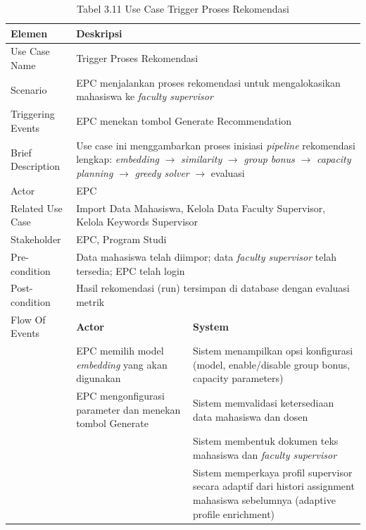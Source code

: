 \begin{longtable}{|p{3.5cm}|p{4.5cm}|p{5cm}|}
\caption{Tabel 3.11 Use Case Trigger Proses Rekomendasi} \label{table:tab3.11} \\
\hline
\textbf{Elemen} & \multicolumn{2}{p{\ucdeskcol}|}{\textbf{Deskripsi}} \\
\hline
\endfirsthead
\endhead
\hline
\endfoot
Use Case Name & \multicolumn{2}{p{\ucdeskcol}|}{Trigger Proses Rekomendasi} \\
\hline
Scenario & \multicolumn{2}{p{\ucdeskcol}|}{EPC menjalankan proses rekomendasi untuk mengalokasikan mahasiswa ke \textit{faculty supervisor}} \\
\hline
Triggering Events & \multicolumn{2}{p{\ucdeskcol}|}{EPC menekan tombol Generate Recommendation} \\
\hline
Brief Description & \multicolumn{2}{p{\ucdeskcol}|}{Use case ini menggambarkan proses inisiasi \textit{pipeline} rekomendasi lengkap: \textit{embedding} $\rightarrow$ \textit{similarity} $\rightarrow$ \textit{group bonus} $\rightarrow$ \textit{capacity planning} $\rightarrow$ \textit{greedy solver} $\rightarrow$ evaluasi} \\
\hline
Actor & \multicolumn{2}{p{\ucdeskcol}|}{EPC} \\
\hline
Related Use Case & \multicolumn{2}{p{\ucdeskcol}|}{Import Data Mahasiswa, Kelola Data Faculty Supervisor, Kelola Keywords Supervisor} \\
\hline
Stakeholder & \multicolumn{2}{p{\ucdeskcol}|}{EPC, Program Studi} \\
\hline
Pre-condition & \multicolumn{2}{p{\ucdeskcol}|}{Data mahasiswa telah diimpor; data \textit{faculty supervisor} telah tersedia; EPC telah login} \\
\hline
Post-condition & \multicolumn{2}{p{\ucdeskcol}|}{Hasil rekomendasi (run) tersimpan di database dengan evaluasi metrik} \\
\hline
Flow Of Events & \textbf{Actor} & \textbf{System} \\
\hline
 & EPC memilih model \textit{embedding} yang akan digunakan & Sistem menampilkan opsi konfigurasi (model, enable/disable group bonus, capacity parameters) \\
\hline
 & EPC mengonfigurasi parameter dan menekan tombol Generate & Sistem memvalidasi ketersediaan data mahasiswa dan dosen \\
\hline
 & & Sistem membentuk dokumen teks mahasiswa dan \textit{faculty supervisor} \\
\hline
 & & Sistem memperkaya profil supervisor secara adaptif dari histori assignment mahasiswa sebelumnya (adaptive profile enrichment) \\

\end{longtable}
